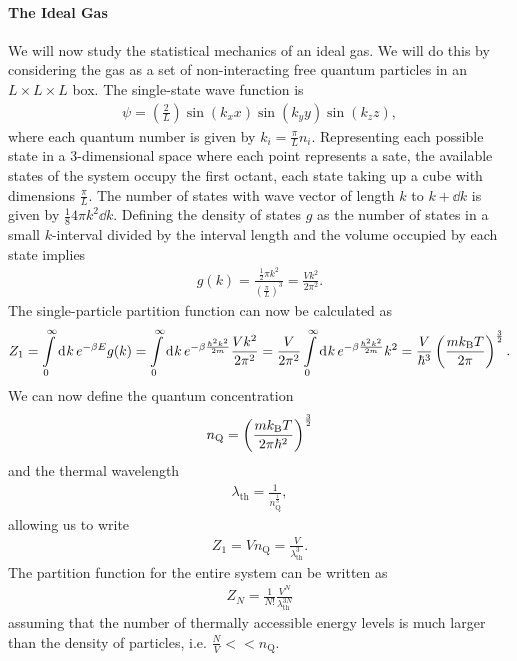 \paragraph{The Ideal Gas}
We will now study the statistical mechanics of an ideal gas. We will do this by considering the gas as a set of non-interacting free quantum particles in an $L\times L\times L$ box. The single-state wave function is
\begin{align*}
	\psi = \left(\frac{2}{L}\right)\sin(k_{x}x)\sin(k_{y}y)\sin(k_{z}z),
\end{align*}
where each quantum number is given by $k_{i} = \frac{\pi}{L}n_{i}$. Representing each possible state in a $3$-dimensional space where each point represents a sate, the available states of the system occupy the first octant, each state taking up a cube with dimensions $\frac{\pi}{L}$. The number of states with wave vector of length $k$ to $k + \dd{k}$ is given by $\frac{1}{8}4\pi k^{2}\dd{k}$. Defining the density of states $g$ as the number of states in a small $k$-interval divided by the interval length and the volume occupied by each state implies 
\begin{align*}
	g(k) = \frac{\frac{1}{2}\pi k^{2}}{\left(\frac{\pi}{L}\right)^{3}} = \frac{Vk^{2}}{2\pi^{2}}.
\end{align*}
The single-particle partition function can now be calculated as
\begin{align*}
	Z_{1} = \int\limits_{0}^{\infty}\dd[]{k}e^{-\beta E}g(k) = \int\limits_{0}^{\infty}\dd[]{k}e^{-\beta\frac{\hbar^{2}k^{2}}{2m}}\frac{Vk^{2}}{2\pi^{2}} = \frac{V}{2\pi^{2}}\int\limits_{0}^{\infty}\dd[]{k}e^{-\beta\frac{\hbar^{2}k^{2}}{2m}}k^{2} = \frac{V}{\hbar^{3}}\left(\frac{mk_{\text{B}} T}{2\pi}\right)^{\frac{3}{2}}.
\end{align*}
We can now define the quantum concentration
\begin{align*}
	n_{\text{Q}} = \left(\frac{mk_{\text{B}} T}{2\pi\hbar^{2}}\right)^{\frac{3}{2}}
\end{align*}
and the thermal wavelength
\begin{align*}
	\lambda_{\text{th}} = \frac{1}{n_{\text{Q}}^{\frac{1}{3}}},
\end{align*}
allowing us to write
\begin{align*}
	Z_{1} = Vn_{\text{Q}} = \frac{V}{\lambda_{\text{th}}^{3}}.
\end{align*}
The partition function for the entire system can be written as
\begin{align*}
	Z_{N} = \frac{1}{N!}\frac{V^{N}}{\lambda_{\text{th}}^{3N}}
\end{align*}
assuming that the number of thermally accessible energy levels is much larger than the density of particles, i.e. $\frac{N}{V} << n_{\text{Q}}$.

